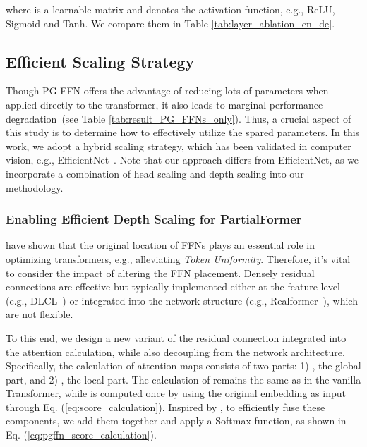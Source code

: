 \documentclass[11pt]{article}
\begin{document}
\noindent
where  is a learnable matrix and  denotes the activation function, e.g., ReLU, Sigmoid and Tanh. We compare them in Table \ref{tab:layer_ablation_en_de}.


\subsection{Efficient Scaling Strategy}
\label{subsec:scale_mechanism}



Though PG-FFN offers the advantage of reducing lots of parameters when applied directly to the transformer, it also leads to marginal performance degradation~(see Table \ref{tab:result_PG_FFNs_only}). Thus, a crucial aspect of this study is to determine how to effectively utilize the spared parameters. In this work, we adopt a hybrid scaling strategy, which has been validated in computer vision, e.g., EfficientNet~\cite{tan2019efficientnet}. Note that our approach differs from EfficientNet, as we incorporate a combination of head scaling and depth scaling into our methodology.




\subsubsection{Enabling Efficient Depth Scaling for PartialFormer}
\citet{Dong2021PureAttention, Wang2022AntiOversmoothing} have shown that the original location of FFNs plays an essential role in optimizing transformers, e.g., alleviating \textit{Token Uniformity}. Therefore, it's vital to consider the impact of altering the FFN placement. Densely residual connections are effective but typically implemented either at the feature level (e.g., DLCL~\cite{wang-etal-2019-learning-deep}) or integrated into the network structure (e.g., Realformer~\cite{he-etal-2021-realformer}), which are not flexible.

To this end, we design a new variant of the residual connection integrated into the attention calculation, while also decoupling from the network architecture. Specifically, the calculation of attention maps consists of two parts: 1) , the global part, and 2) , the local part. The calculation of  remains the same as in the vanilla Transformer, while  is computed once by using the original embedding as input through Eq. (\ref{eq:score_calculation}).
Inspired by \citet{he-etal-2021-realformer}, to efficiently fuse these components, we add them together and apply a Softmax function, as shown in Eq. (\ref{eq:pgffn_score_calculation}).
\end{document}
